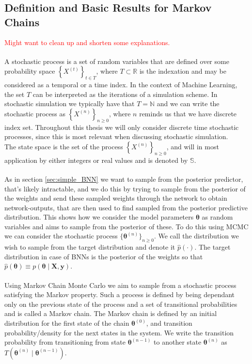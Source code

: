 \subsection{Definition and Basic Results for Markov Chains}\label{sec:basic_mc}
\textcolor{red}{Might want to clean up and shorten some explanations.}\\
\\
A stochastic process is a set of random variables that are defined over some probability space $\left\{X^{(t)} \right\}_{t\in T}$, where $T\subset \mathbb{R}$ is the indexation and may be considered as a temporal or a time index. In the context of Machine Learning, the set $T$ can be interpreted as the iterations of a simulation scheme. In stochastic simulation we typically have that $T=\mathbb{N}$ and we can write the stochastic process as $\left\{X^{(n)}\right\}_{n\geq 0}$, where $n$ reminds us that we have discrete index set. Throughout this thesis we will only consider discrete time stochastic processes, since this is most relevant when discussing stochastic simulation. \\
The state space is the set of the process $\left\{X^{(n)} \right\}_{n\geq 0}$, and will in most application by either integers or real values and is denoted by $\mathbb{S}$. 
\\
\\
As in section \ref{sec:simple_BNN} we want to sample from the posterior predictor, that's likely intractable, and we do this by trying to sample from the posterior of the weights and send these sampled weights through the network to obtain network-outputs, that are then used to find sampled from the posterior predictive distribution. This shows how we consider the model parameters $\boldsymbol{\theta}$ as random variables and aims to sample from the posterior of these. To do this using MCMC we can consider the stochastic process $\{\boldsymbol{\theta}^{(n)}\}_{n\geq 0}$. We call the distribution we wish to sample from the target distribution and denote it $\hat{p}(\cdot)$. The target distribution in case of BNNs is the posterior of the weights so that $\hat{p}(\boldsymbol{\theta})\equiv p(\boldsymbol{\theta}\mid \mathbf{X},\mathbf{y})$. 
\\
\\
Using Markov Chain Monte Carlo we aim to sample from a stochastic process satisfying the Markov property. Such a process is defined by being dependant only on the previous state of the process and a set of transitional probabilities and is called a Markov chain. The Markov chain is defined by an initial distribution for the first state of the chain $\boldsymbol{\theta}^{(0)}$, and transition probability/density for the next states in the system. We write the transition probability from transitioning from state $\boldsymbol{\theta}^{(n-1)}$ to another state $\boldsymbol{\theta}^{(n)}$ as $T(\boldsymbol{\theta}^{(n)}\mid \boldsymbol{\theta}^{(n-1)})$. \\
